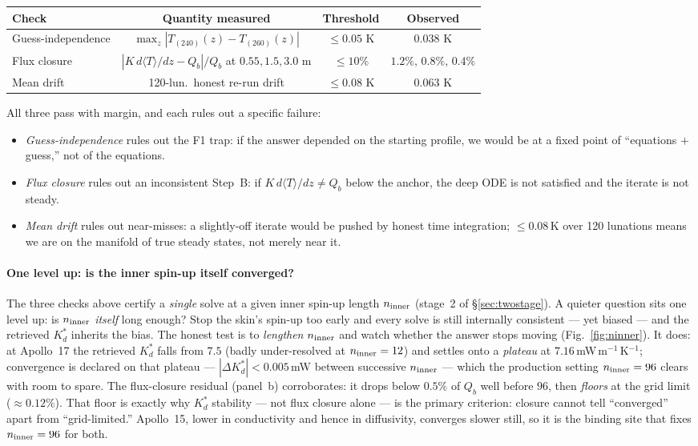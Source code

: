 \documentclass[11pt]{report}
\newcommand{\Tm}{\langle T\rangle}
\begin{document}
\begin{center}\small
\begin{tabular}{@{}lccc@{}}
\toprule
Check & Quantity measured & Threshold & Observed \\
\midrule
Guess-independence & $\max_z|T_{(240)}(z)-T_{(260)}(z)|$  & $\le 0.05$ K   & $0.038$ K \\
Flux closure       & $|K\,d\Tm/dz - Q_b|/Q_b$ at $0.55,1.5,3.0$ m & $\le 10\%$ & $1.2\%,\,0.8\%,\,0.4\%$ \\
Mean drift         & 120-lun.\ honest re-run drift     & $\le 0.08$ K   & $0.063$ K \\
\bottomrule
\end{tabular}
\end{center}

\noindent All three pass with margin, and each rules out a specific failure:
\begin{itemize}[leftmargin=1.4em,itemsep=2pt]
\item \emph{Guess-independence} rules out the F1 trap: if the answer depended on
  the starting profile, we would be at a fixed point of ``equations $+$ guess,''
  not of the equations.
\item \emph{Flux closure} rules out an inconsistent Step~B: if $K\,d\Tm/dz\ne
  Q_b$ below the anchor, the deep ODE is not satisfied and the iterate is not
  steady.
\item \emph{Mean drift} rules out near-misses: a slightly-off iterate would be
  pushed by honest time integration; $\le0.08$\,K over 120 lunations means we are
  on the manifold of true steady states, not merely near it.
\end{itemize}

\paragraph{\textbf{One level up: is the inner spin-up itself converged?}} The
three checks above certify a \emph{single} solve at a given inner spin-up length
$n_{\rm inner}$ (stage~2 of \S\ref{sec:twostage}). A quieter question sits one
level up: is $n_{\rm inner}$ \emph{itself} long enough? Stop the skin's spin-up
too early and every solve is still internally consistent --- yet biased --- and the
retrieved $K_d^{*}$ inherits the bias. The honest test is to \emph{lengthen}
$n_{\rm inner}$ and watch whether the answer stops moving (Fig.~\ref{fig:ninner}).
It does: at Apollo~17 the retrieved $K_d^{*}$ falls from $7.5$ (badly
under-resolved at $n_{\rm inner}=12$) and settles onto a \emph{plateau} at
$7.16$\,mW\,m$^{-1}$\,K$^{-1}$; convergence is declared on that plateau ---
$|\Delta K_d^{*}|<0.005$\,mW between successive $n_{\rm inner}$ --- which the
production setting $n_{\rm inner}=96$ clears with room to spare. The flux-closure
residual (panel~b) corroborates: it drops below $0.5\%$ of $Q_b$ well before $96$,
then \emph{floors} at the grid limit ($\approx0.12\%$). That floor is exactly why
$K_d^{*}$ stability --- not flux closure alone --- is the primary criterion:
closure cannot tell ``converged'' apart from ``grid-limited.'' Apollo~15, lower in
conductivity and hence in diffusivity, converges slower still, so it is the
binding site that fixes $n_{\rm inner}=96$ for both.
\end{document}
